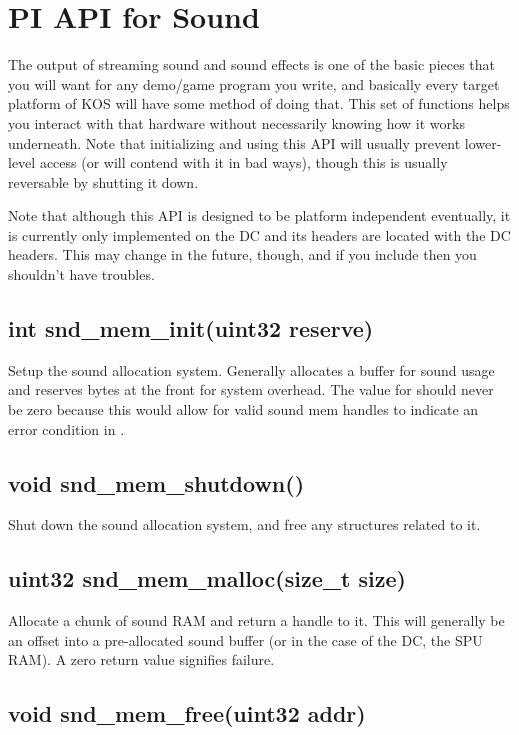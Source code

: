 \documentclass[english]{report}
\begin{document}
\section{PI API for Sound}

The output of streaming sound and sound effects is one of the basic
pieces that you will want for any demo/game program you write, and
basically every target platform of KOS will have some method of doing
that. This set of functions helps you interact with that hardware
without necessarily knowing how it works underneath. Note that initializing
and using this API will usually prevent lower-level access (or will
contend with it in bad ways), though this is usually reversable by
shutting it down.

Note that although this API is designed to be platform independent
eventually, it is currently only implemented on the DC and its
headers are located with the DC headers. This may change in the
future, though, and if you include  then you
shouldn't have troubles.

\subsection{int snd\_mem\_init(uint32 reserve)}

Setup the sound allocation system. Generally allocates a buffer for
sound usage and reserves  bytes at the front for
system overhead. The value for  should never
be zero because this would allow for valid sound mem handles to
indicate an error condition in .

\subsection{void snd\_mem\_shutdown()}

Shut down the sound allocation system, and free any structures
related to it.

\subsection{uint32 snd\_mem\_malloc(size\_t size)}

Allocate a chunk of sound RAM and return a handle to it. This will generally
be an offset into a pre-allocated sound buffer (or in the case of the DC,
the SPU RAM). A zero return value signifies failure.

\subsection{void snd\_mem\_free(uint32 addr)}
\end{document}
